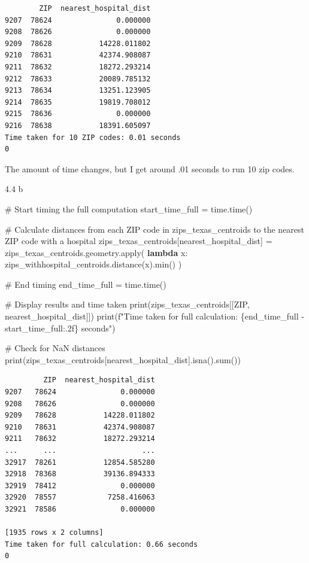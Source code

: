 \documentclass[
  letterpaper,
  DIV=11,
  numbers=noendperiod]{scrartcl}
\newenvironment{Shaded}{\begin{snugshade}}{\end{snugshade}}
\newcommand{\BuiltInTok}[1]{\textcolor[rgb]{0.00,0.23,0.31}{#1}}
\newcommand{\CommentTok}[1]{\textcolor[rgb]{0.37,0.37,0.37}{#1}}
\newcommand{\KeywordTok}[1]{\textcolor[rgb]{0.00,0.23,0.31}{\textbf{#1}}}
\newcommand{\NormalTok}[1]{\textcolor[rgb]{0.00,0.23,0.31}{#1}}
\newcommand{\OperatorTok}[1]{\textcolor[rgb]{0.37,0.37,0.37}{#1}}
\newcommand{\SpecialCharTok}[1]{\textcolor[rgb]{0.37,0.37,0.37}{#1}}
\newcommand{\SpecialStringTok}[1]{\textcolor[rgb]{0.13,0.47,0.30}{#1}}
\newcommand{\StringTok}[1]{\textcolor[rgb]{0.13,0.47,0.30}{#1}}
\begin{document}
\begin{verbatim}
        ZIP  nearest_hospital_dist
9207  78624               0.000000
9208  78626               0.000000
9209  78628           14228.011802
9210  78631           42374.908087
9211  78632           18272.293214
9212  78633           20089.785132
9213  78634           13251.123905
9214  78635           19819.708012
9215  78636               0.000000
9216  78638           18391.605097
Time taken for 10 ZIP codes: 0.01 seconds
0
\end{verbatim}

The amount of time changes, but I get around .01 seconds to run 10 zip
codes.

4.4 b

\begin{Shaded}
\begin{Highlighting}[]
\CommentTok{\# Start timing the full computation}
\NormalTok{start\_time\_full }\OperatorTok{=}\NormalTok{ time.time()}

\CommentTok{\# Calculate distances from each ZIP code in zips\_texas\_centroids to the nearest ZIP code with a hospital}
\NormalTok{zips\_texas\_centroids[}\StringTok{\textquotesingle{}nearest\_hospital\_dist\textquotesingle{}}\NormalTok{] }\OperatorTok{=}\NormalTok{ zips\_texas\_centroids.geometry.}\BuiltInTok{apply}\NormalTok{(}
    \KeywordTok{lambda}\NormalTok{ x: zips\_withhospital\_centroids.distance(x).}\BuiltInTok{min}\NormalTok{()}
\NormalTok{)}

\CommentTok{\# End timing}
\NormalTok{end\_time\_full }\OperatorTok{=}\NormalTok{ time.time()}

\CommentTok{\# Display results and time taken}
\BuiltInTok{print}\NormalTok{(zips\_texas\_centroids[[}\StringTok{\textquotesingle{}ZIP\textquotesingle{}}\NormalTok{, }\StringTok{\textquotesingle{}nearest\_hospital\_dist\textquotesingle{}}\NormalTok{]])}
\BuiltInTok{print}\NormalTok{(}\SpecialStringTok{f"Time taken for full calculation: }\SpecialCharTok{\{}\NormalTok{end\_time\_full }\OperatorTok{{-}}\NormalTok{ start\_time\_full}\SpecialCharTok{:.2f\}}\SpecialStringTok{ seconds"}\NormalTok{)}

\CommentTok{\# Check for NaN distances}
\BuiltInTok{print}\NormalTok{(zips\_texas\_centroids[}\StringTok{\textquotesingle{}nearest\_hospital\_dist\textquotesingle{}}\NormalTok{].isna().}\BuiltInTok{sum}\NormalTok{())}
\end{Highlighting}
\end{Shaded}

\begin{verbatim}
         ZIP  nearest_hospital_dist
9207   78624               0.000000
9208   78626               0.000000
9209   78628           14228.011802
9210   78631           42374.908087
9211   78632           18272.293214
...      ...                    ...
32917  78261           12854.585280
32918  78368           39136.894333
32919  78412               0.000000
32920  78557            7258.416063
32921  78586               0.000000

[1935 rows x 2 columns]
Time taken for full calculation: 0.66 seconds
0
\end{verbatim}
\end{document}
